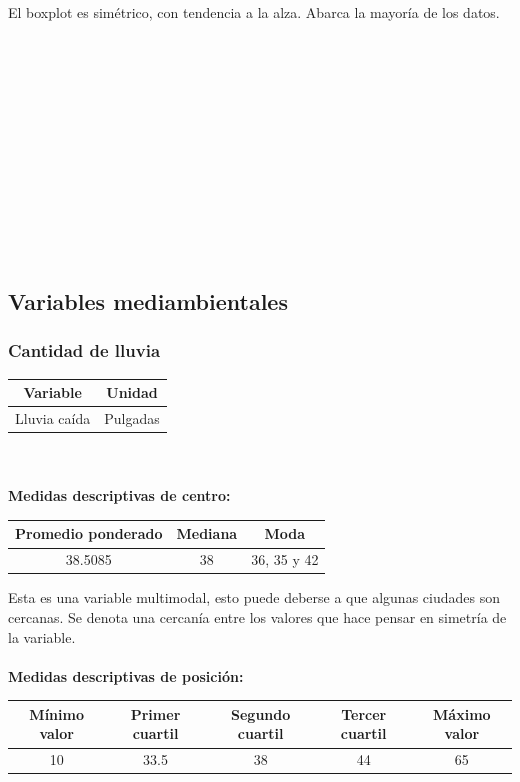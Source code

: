 \documentclass[11pt]{article}
\begin{document}
El boxplot es simétrico, con tendencia a la alza. Abarca la mayoría de los datos.
\\
\\
\\
\\
\\
\\
\\
\\
\\
\\
\\
\\
\\

\subsection{Variables mediambientales}

\subsubsection{Cantidad de lluvia}

\begin{center}
\begin{tabular}{|c|c|}
    \hline
    Variable & Unidad  \\ \hline
    Lluvia caída & Pulgadas \\
    \hline
\end{tabular}
\end{center}
\\
\\

\textbf{Medidas descriptivas de centro:}

\begin{center}
\begin{tabular}{|c|c|c|}
    \hline
    Promedio ponderado & Mediana & Moda \\ \hline
    38.5085  & 38 & 36, 35 y 42 \\
    \hline
\end{tabular}
\end{center}

Esta es una variable multimodal, esto puede deberse a que algunas ciudades son cercanas. Se denota una cercanía entre los valores que hace pensar en simetría de la variable.
\\
\\
\textbf{Medidas descriptivas de posición:}

\begin{center}
\begin{tabular}{|c|c|c|c|c|}
    \hline
    Mínimo valor & Primer cuartil & Segundo cuartil & Tercer cuartil & Máximo valor\\ \hline
    10 & 33.5 & 38 & 44 & 65\\
    \hline
\end{tabular}
\end{center}
\end{document}
